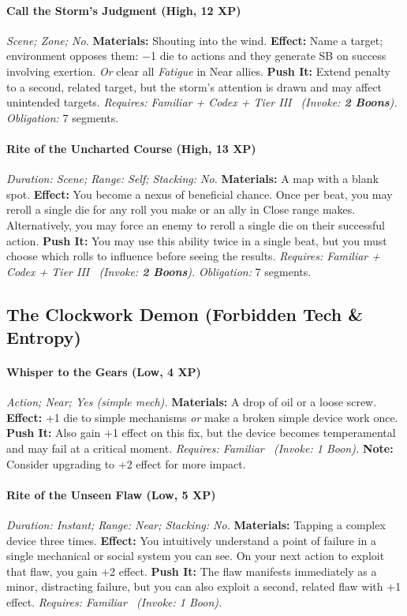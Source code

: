 \paragraph{Call the Storm's Judgment (High, 12 XP)} \emph{Scene; Zone; No.}
\textbf{Materials:} Shouting into the wind.
\textbf{Effect:} Name a target; environment opposes them: −1 die to actions and they generate SB on success involving exertion. \emph{Or} clear all \emph{Fatigue} in Near allies.
\textbf{Push It:} Extend penalty to a second, related target, but the storm's attention is drawn and may affect unintended targets.
\emph{Requires: Familiar + Codex + Tier III \ (\textit{Invoke:} \textbf{2 Boons}).}
\emph{Obligation:} 7 segments.

\paragraph{Rite of the Uncharted Course (High, 13 XP)} \emph{Duration: Scene; Range: Self; Stacking: No.}
\textbf{Materials:} A map with a blank spot.
\textbf{Effect:} You become a nexus of beneficial chance. Once per beat, you may reroll a single die for any roll you make or an ally in Close range makes. Alternatively, you may force an enemy to reroll a single die on their successful action.
\textbf{Push It:} You may use this ability twice in a single beat, but you must choose which rolls to influence before seeing the results.
\emph{Requires: Familiar + Codex + Tier III \ (\textit{Invoke:} \textbf{2 Boons}).}
\emph{Obligation:} 7 segments.

\subsection{The Clockwork Demon (Forbidden Tech \& Entropy)}
\paragraph{Whisper to the Gears (Low, 4 XP)} \emph{Action; Near; Yes (simple mech).}
\textbf{Materials:} A drop of oil or a loose screw.
\textbf{Effect:} +1 die to simple mechanisms \emph{or} make a broken simple device work once.
\textbf{Push It:} Also gain +1 effect on this fix, but the device becomes temperamental and may fail at a critical moment.
\emph{Requires: Familiar \ (\textit{Invoke:} 1 Boon).} \textbf{Note:} Consider upgrading to +2 effect for more impact.
\paragraph{Rite of the Unseen Flaw (Low, 5 XP)} \emph{Duration: Instant; Range: Near; Stacking: No.}
\textbf{Materials:} Tapping a complex device three times.
\textbf{Effect:} You intuitively understand a point of failure in a single mechanical or social system you can see. On your next action to exploit that flaw, you gain +2 effect.
\textbf{Push It:} The flaw manifests immediately as a minor, distracting failure, but you can also exploit a second, related flaw with +1 effect.
\emph{Requires: Familiar \ (\textit{Invoke:} 1 Boon).}
